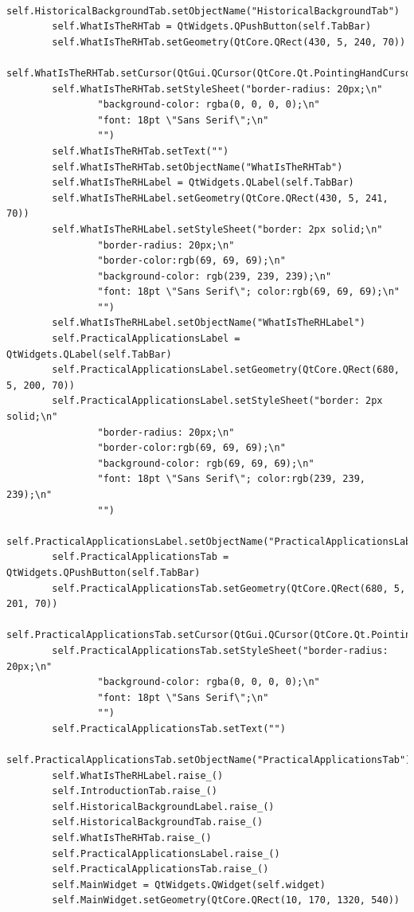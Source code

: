 \documentclass{article}
\begin{document}
\begin{lstlisting}
        self.HistoricalBackgroundTab.setObjectName("HistoricalBackgroundTab")
        self.WhatIsTheRHTab = QtWidgets.QPushButton(self.TabBar)
        self.WhatIsTheRHTab.setGeometry(QtCore.QRect(430, 5, 240, 70))
        self.WhatIsTheRHTab.setCursor(QtGui.QCursor(QtCore.Qt.PointingHandCursor))
        self.WhatIsTheRHTab.setStyleSheet("border-radius: 20px;\n"
                "background-color: rgba(0, 0, 0, 0);\n"
                "font: 18pt \"Sans Serif\";\n"
                "")
        self.WhatIsTheRHTab.setText("")
        self.WhatIsTheRHTab.setObjectName("WhatIsTheRHTab")
        self.WhatIsTheRHLabel = QtWidgets.QLabel(self.TabBar)
        self.WhatIsTheRHLabel.setGeometry(QtCore.QRect(430, 5, 241, 70))
        self.WhatIsTheRHLabel.setStyleSheet("border: 2px solid;\n"
                "border-radius: 20px;\n"
                "border-color:rgb(69, 69, 69);\n"
                "background-color: rgb(239, 239, 239);\n"
                "font: 18pt \"Sans Serif\"; color:rgb(69, 69, 69);\n"
                "")
        self.WhatIsTheRHLabel.setObjectName("WhatIsTheRHLabel")
        self.PracticalApplicationsLabel = QtWidgets.QLabel(self.TabBar)
        self.PracticalApplicationsLabel.setGeometry(QtCore.QRect(680, 5, 200, 70))
        self.PracticalApplicationsLabel.setStyleSheet("border: 2px solid;\n"
                "border-radius: 20px;\n"
                "border-color:rgb(69, 69, 69);\n"
                "background-color: rgb(69, 69, 69);\n"
                "font: 18pt \"Sans Serif\"; color:rgb(239, 239, 239);\n"
                "")
        self.PracticalApplicationsLabel.setObjectName("PracticalApplicationsLabel")
        self.PracticalApplicationsTab = QtWidgets.QPushButton(self.TabBar)
        self.PracticalApplicationsTab.setGeometry(QtCore.QRect(680, 5, 201, 70))
        self.PracticalApplicationsTab.setCursor(QtGui.QCursor(QtCore.Qt.PointingHandCursor))
        self.PracticalApplicationsTab.setStyleSheet("border-radius: 20px;\n"
                "background-color: rgba(0, 0, 0, 0);\n"
                "font: 18pt \"Sans Serif\";\n"
                "")
        self.PracticalApplicationsTab.setText("")
        self.PracticalApplicationsTab.setObjectName("PracticalApplicationsTab")
        self.WhatIsTheRHLabel.raise_()
        self.IntroductionTab.raise_()
        self.HistoricalBackgroundLabel.raise_()
        self.HistoricalBackgroundTab.raise_()
        self.WhatIsTheRHTab.raise_()
        self.PracticalApplicationsLabel.raise_()
        self.PracticalApplicationsTab.raise_()
        self.MainWidget = QtWidgets.QWidget(self.widget)
        self.MainWidget.setGeometry(QtCore.QRect(10, 170, 1320, 540))

\end{lstlisting}
\end{document}
